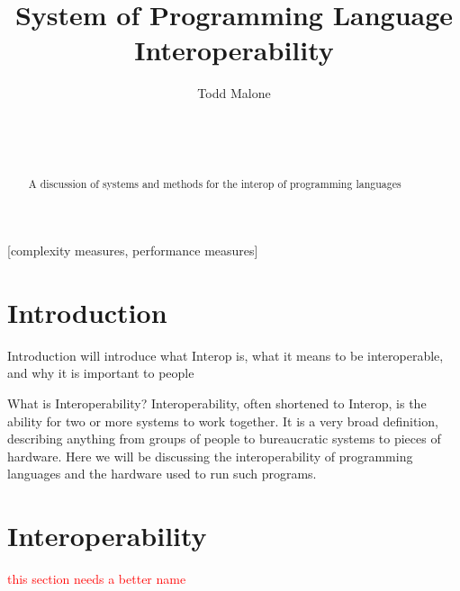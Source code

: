 \documentclass{sig-alternate}
\newcommand{\mycomment}[1]{\textcolor{red}{#1}}
\begin{document}

\title{System of Programming Language Interoperability}

\author{
\alignauthor
Todd Malone\\
	\\
	\\
	\\
}

\maketitle
\begin{abstract}
A discussion of systems and methods for the interop of programming languages
\end{abstract}

[complexity measures, performance measures]



\section{Introduction}
Introduction will introduce what Interop is, what it means to be interoperable, and
why it is important to people

What is Interoperability? Interoperability, often shortened to Interop, is the ability for two or more systems to work together. It is a very broad definition, describing anything from groups of people to bureaucratic systems to pieces of hardware. Here we will be discussing the interoperability of programming languages and the hardware used to run such programs.

\section{Interoperability}\label{difficulties}
\mycomment{this section needs a better name}
\end{document}
